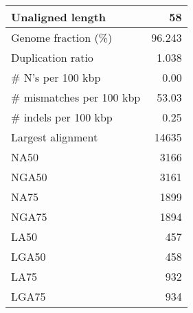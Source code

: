 \documentclass[12pt,a4paper]{article}
\begin{document}
\begin{table}[ht]
\begin{center}
\begin{tabular}{|l*{1}{|r}|}
Unaligned length & 58 \\ \hline
Genome fraction (\%) & 96.243 \\ \hline
Duplication ratio & 1.038 \\ \hline
\# N's per 100 kbp & 0.00 \\ \hline
\# mismatches per 100 kbp & 53.03 \\ \hline
\# indels per 100 kbp & 0.25 \\ \hline
Largest alignment & 14635 \\ \hline
NA50 & 3166 \\ \hline
NGA50 & 3161 \\ \hline
NA75 & 1899 \\ \hline
NGA75 & 1894 \\ \hline
LA50 & 457 \\ \hline
LGA50 & 458 \\ \hline
LA75 & 932 \\ \hline
LGA75 & 934 \\ \hline
\end{tabular}
\end{center}
\end{table}
\end{document}
